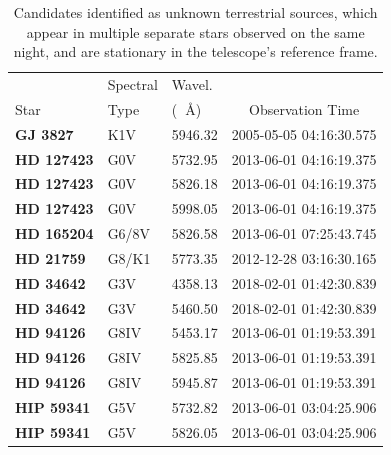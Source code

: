\documentclass[linenumbers]{aastex701}
\providecommand{\DIFadd}[1]{{\bf #1}} %
\providecommand{\DIFaddFL}[1]{\DIFadd{#1}} %
\providecommand{\DIFaddbeginFL}{} %
\providecommand{\DIFaddendFL}{} %
\begin{document}
\begin{table}
\centering
\begin{tabular}{|l|l|l|c|}
\hline
     & Spectral & Wavel. & \\
Star &  Type & (\DIFaddbeginFL \DIFaddFL{~}\DIFaddendFL \AA) & Observation Time \\
\hline
 \DIFaddbeginFL \DIFaddFL{GJ 3827   }\DIFaddendFL & K1V   & 5946.32 & 2005-05-05 04:16:30.575\\
 \DIFaddbeginFL \DIFaddFL{HD 127423 }\DIFaddendFL & G0V   & 5732.95 & 2013-06-01 04:16:19.375\\
 \DIFaddbeginFL \DIFaddFL{HD 127423 }\DIFaddendFL & G0V   & 5826.18 & 2013-06-01 04:16:19.375\\
 \DIFaddbeginFL \DIFaddFL{HD 127423 }\DIFaddendFL & G0V   & 5998.05 & 2013-06-01 04:16:19.375\\
 \DIFaddbeginFL \DIFaddFL{HD 165204 }\DIFaddendFL & G6/8V & 5826.58 & 2013-06-01 07:25:43.745\\
 \DIFaddbeginFL \DIFaddFL{HD 21759  }\DIFaddendFL & G8/K1 & 5773.35 & 2012-12-28 03:16:30.165\\
 \DIFaddbeginFL \DIFaddFL{HD 34642  }\DIFaddendFL & G3V   & 4358.13 & 2018-02-01 01:42:30.839\\
 \DIFaddbeginFL \DIFaddFL{HD 34642  }\DIFaddendFL & G3V   & 5460.50 & 2018-02-01 01:42:30.839\\
 \DIFaddbeginFL \DIFaddFL{HD 94126  }\DIFaddendFL & G8IV  & 5453.17 & 2013-06-01 01:19:53.391\\
 \DIFaddbeginFL \DIFaddFL{HD 94126  }\DIFaddendFL & G8IV  & 5825.85 & 2013-06-01 01:19:53.391\\
 \DIFaddbeginFL \DIFaddFL{HD 94126  }\DIFaddendFL & G8IV  & 5945.87 & 2013-06-01 01:19:53.391\\
 \DIFaddbeginFL \DIFaddFL{HIP 59341 }\DIFaddendFL & G5V   & 5732.82 & 2013-06-01 03:04:25.906\\
 \DIFaddbeginFL \DIFaddFL{HIP 59341 }\DIFaddendFL & G5V   & 5826.05 & 2013-06-01 03:04:25.906\\
\hline
\end{tabular}
\caption{Candidates identified as unknown terrestrial sources, which appear in multiple separate stars observed on the same night, and are stationary in the telescope's reference frame.}
\label{table:terrestrial_interference}
\end{table}
\end{document}
